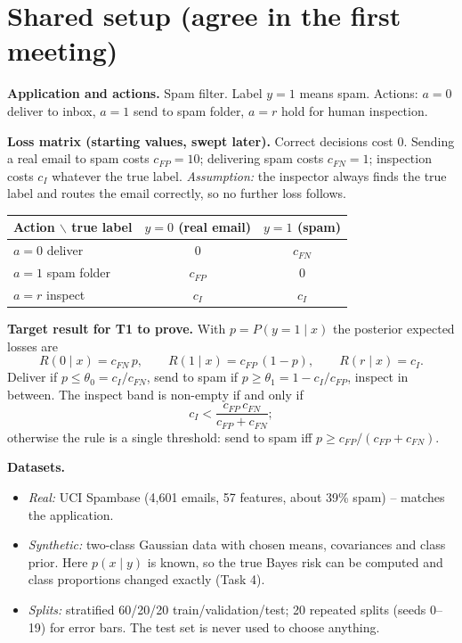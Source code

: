 \documentclass[11pt,a4paper]{article}
\begin{document}
\section{Shared setup (agree in the first meeting)}

\textbf{Application and actions.} Spam filter. Label $y=1$ means spam. Actions: $a=0$ deliver to inbox,
$a=1$ send to spam folder, $a=r$ hold for human inspection.

\textbf{Loss matrix (starting values, swept later).} Correct decisions cost $0$. Sending a real email to spam costs
$c_{FP}=10$; delivering spam costs $c_{FN}=1$; inspection costs $c_I$ whatever the true label.
\emph{Assumption:} the inspector always finds the true label and routes the email correctly, so no further loss follows.

\begin{center}
\begin{tabular}{lcc}
\toprule
Action $\backslash$ true label & $y=0$ (real email) & $y=1$ (spam) \\
\midrule
$a=0$ deliver & $0$ & $c_{FN}$ \\
$a=1$ spam folder & $c_{FP}$ & $0$ \\
$a=r$ inspect & $c_I$ & $c_I$ \\
\bottomrule
\end{tabular}
\end{center}

\textbf{Target result for T1 to prove.} With $p = P(y=1\mid x)$ the posterior expected losses are
\[
R(0\mid x) = c_{FN}\,p,\qquad R(1\mid x) = c_{FP}\,(1-p),\qquad R(r\mid x) = c_I .
\]
Deliver if $p \le \theta_0 = c_I/c_{FN}$, send to spam if $p \ge \theta_1 = 1 - c_I/c_{FP}$, inspect in between.
The inspect band is non-empty if and only if
\[
c_I < \frac{c_{FP}\,c_{FN}}{c_{FP}+c_{FN}};
\]
otherwise the rule is a single threshold: send to spam iff $p \ge c_{FP}/(c_{FP}+c_{FN})$.

\textbf{Datasets.}
\begin{itemize}[itemsep=1pt,topsep=2pt]
  \item \emph{Real:} UCI Spambase (4{,}601 emails, 57 features, about 39\% spam) -- matches the application.
  \item \emph{Synthetic:} two-class Gaussian data with chosen means, covariances and class prior. Here $p(x\mid y)$ is
        known, so the true Bayes risk can be computed and class proportions changed exactly (Task 4).
  \item \emph{Splits:} stratified 60/20/20 train/validation/test; 20 repeated splits (seeds 0--19) for error bars.
        The test set is never used to choose anything.
\end{itemize}
\end{document}
